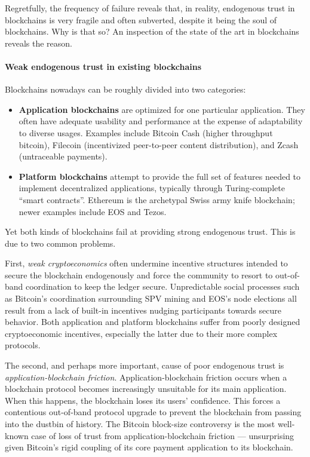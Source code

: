 \documentclass[]{article}
\providecommand{\tightlist}{%
  \setlength{\itemsep}{0pt}\setlength{\parskip}{0pt}}
\let\oldparagraph\paragraph
\renewcommand{\paragraph}[1]{\oldparagraph{#1}\mbox{}}
\begin{document}
Regretfully, the frequency of failure reveals that, in reality,
endogenous trust in blockchains is very fragile and often subverted,
despite it being the soul of blockchains. Why is that so? An inspection
of the state of the art in blockchains reveals the reason.

\hypertarget{weak-endogenous-trust-in-existing-blockchains}{%
\paragraph{Weak endogenous trust in existing
blockchains}\label{weak-endogenous-trust-in-existing-blockchains}}

Blockchains nowadays can be roughly divided into two categories:

\begin{itemize}
\tightlist
\item
  \textbf{Application blockchains} are optimized for one particular
  application. They often have adequate usability and performance at the
  expense of adaptability to diverse usages. Examples include Bitcoin
  Cash (higher throughput bitcoin), Filecoin (incentivized peer-to-peer
  content distribution), and Zcash (untraceable payments).
\item
  \textbf{Platform blockchains} attempt to provide the full set of
  features needed to implement decentralized applications, typically
  through Turing-complete ``smart contracts''. Ethereum is the
  archetypal Swiss army knife blockchain; newer examples include EOS and
  Tezos.
\end{itemize}

Yet both kinds of blockchains fail at providing strong endogenous trust.
This is due to two common problems.

First, \emph{weak cryptoeconomics} often undermine incentive structures
intended to secure the blockchain endogenously and force the community
to resort to out-of-band coordination to keep the ledger secure.
Unpredictable social processes such as Bitcoin's coordination
surrounding SPV mining and EOS's node elections all result from a lack
of built-in incentives nudging participants towards secure behavior.
Both application and platform blockchains suffer from poorly designed
cryptoeconomic incentives, especially the latter due to their more
complex protocols.

The second, and perhaps more important, cause of poor endogenous trust
is \emph{application-blockchain friction}. Application-blockchain
friction occurs when a blockchain protocol becomes increasingly
unsuitable for its main application. When this happens, the blockchain
loses its users' confidence. This forces a contentious out-of-band
protocol upgrade to prevent the blockchain from passing into the dustbin
of history. The Bitcoin block-size controversy is the most well-known
case of loss of trust from application-blockchain friction ---
unsurprising given Bitcoin's rigid coupling of its core payment
application to its blockchain.
\end{document}
